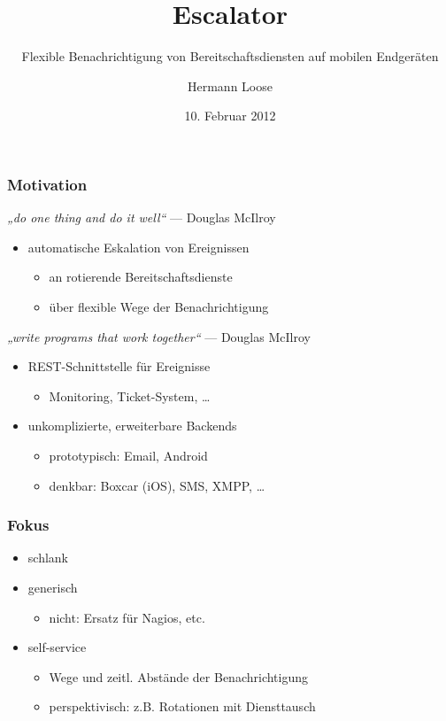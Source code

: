\documentclass[10pt]{beamer}
\title{Escalator}
\subtitle{Flexible Benachrichtigung von Bereitschaftsdiensten auf mobilen Endgeräten}
\author{Hermann Loose}
\institute[ZIH TUD]{Zentrum für Informationsdienste und Hochleistungsrechnen — TU Dresden}
\date{10. Februar 2012}
\begin{document}
\zihmaketitle

\begin{frame}
  \frametitle{Motivation}
  \begin{flushleft}
    \emph{„do one thing and do it well“} — Douglas McIlroy
  \end{flushleft}
  \begin{itemize}
    \item automatische Eskalation von Ereignissen
    \begin{itemize}
      \item an rotierende Bereitschaftsdienste
      \item über flexible Wege der Benachrichtigung
    \end{itemize}
  \end{itemize}
  \begin{flushleft}
    \emph{„write programs that work together“} — Douglas McIlroy
  \end{flushleft}
  \begin{itemize}
    \item REST-Schnittstelle für Ereignisse
    \begin{itemize}
      \item Monitoring, Ticket-System, …
    \end{itemize}
    \item unkomplizierte, erweiterbare Backends
    \begin{itemize}
      \item prototypisch: Email, Android
      \item denkbar: Boxcar (iOS), SMS, XMPP, …
    \end{itemize}
  \end{itemize}
\end{frame}

\begin{frame}[c]
  \frametitle{Fokus}
  \begin{itemize}
    \item schlank
    \item generisch
    \begin{itemize}
      \item nicht: Ersatz für Nagios, etc.
    \end{itemize}
    \item self-service
    \begin{itemize}
      \item Wege und zeitl. Abstände der Benachrichtigung
      \item perspektivisch: z.B. Rotationen mit Diensttausch
    \end{itemize}
  \end{itemize}
\end{frame}
\end{document}
